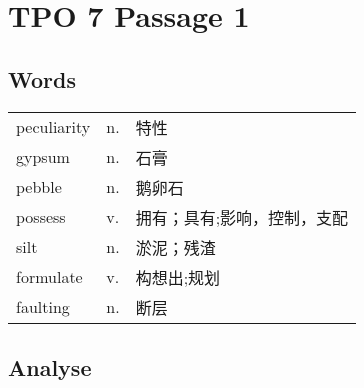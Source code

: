 \section{TPO 7 Passage 1}

\subsection{Words}

\begin{tabular}{lll}
    peculiarity & n. & 特性             \\
    gypsum      & n. & 石膏             \\
    pebble      & n. & 鹅卵石            \\
    possess     & v. & 拥有；具有;影响，控制，支配 \\
    silt        & n. & 淤泥；残渣          \\
    formulate   & v. & 构想出;规划         \\
    faulting    & n. & 断层             \\
\end{tabular}

\subsection{Analyse}

